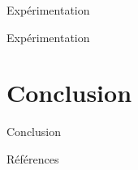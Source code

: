 \documentclass{beamer}
\begin{document}
\begin{frame}{Expérimentation}
\end{frame}

\begin{frame}{Expérimentation}
\end{frame}

\section{Conclusion}

\begin{frame}{Conclusion}
\end{frame}

\begin{frame}{Références}
  \renewcommand*{\bibfont}{\small}
  \printbibliography[heading=none]
\end{frame}
\end{document}
